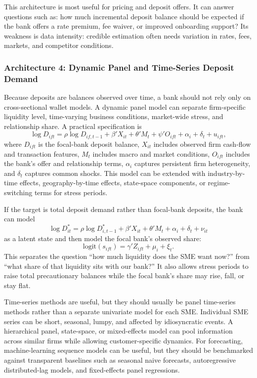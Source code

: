 \documentclass[11pt]{article}
\begin{document}
This architecture is most useful for pricing and deposit offers. It can answer
questions such as: how much incremental deposit balance should be expected if
the bank offers a rate premium, fee waiver, or improved onboarding support? Its
weakness is data intensity: credible estimation often needs variation in rates,
fees, markets, and competitor conditions.

\subsubsection*{Architecture 4: Dynamic Panel and Time-Series Deposit Demand}

Because deposits are balances observed over time, a bank should not rely only on
cross-sectional wallet models. A dynamic panel model can separate firm-specific
liquidity level, time-varying business conditions, market-wide stress, and
relationship share. A practical specification is
\[
  \log D_{ift}
  =
  \rho \log D_{if,t-1}
  + \beta' X_{it}
  + \theta' M_t
  + \psi' O_{ift}
  + \alpha_i
  + \delta_t
  + u_{ift},
\]
where $D_{ift}$ is the focal-bank deposit balance, $X_{it}$ includes observed
firm cash-flow and transaction features, $M_t$ includes macro and market
conditions, $O_{ift}$ includes the bank's offer and relationship terms,
$\alpha_i$ captures persistent firm heterogeneity, and $\delta_t$ captures
common shocks. This model can be extended with industry-by-time effects,
geography-by-time effects, state-space components, or regime-switching terms for
stress periods.

If the target is total deposit demand rather than focal-bank deposits, the bank
can model
\[
  \log D_{it}^{*}
  =
  \rho \log D_{i,t-1}^{*}
  + \beta' X_{it}
  + \theta' M_t
  + \alpha_i
  + \delta_t
  + \nu_{it}
\]
as a latent state and then model the focal bank's observed share:
\[
  \mathrm{logit}(s_{ift}) =
  \gamma' Z_{ift} + \mu_i + \xi_t.
\]
This separates the question ``how much liquidity does the SME want now?'' from
``what share of that liquidity sits with our bank?'' It also allows stress
periods to raise total precautionary balances while the focal bank's share may
rise, fall, or stay flat.

Time-series methods are useful, but they should usually be panel time-series
methods rather than a separate univariate model for each SME. Individual SME
series can be short, seasonal, lumpy, and affected by idiosyncratic events. A
hierarchical panel, state-space, or mixed-effects model can pool information
across similar firms while allowing customer-specific dynamics. For forecasting,
machine-learning sequence models can be useful, but they should be benchmarked
against transparent baselines such as seasonal naive forecasts, autoregressive
distributed-lag models, and fixed-effects panel regressions.
\end{document}
